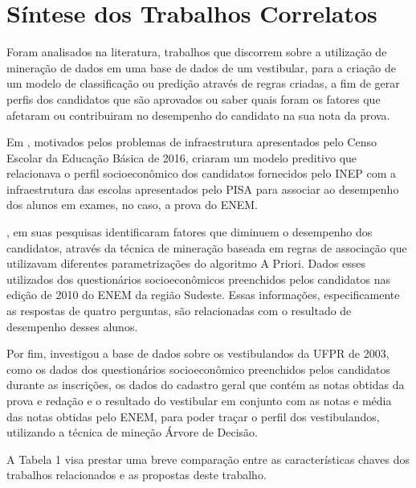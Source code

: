 \section{Síntese dos Trabalhos Correlatos}

\par
Foram analisados na literatura, trabalhos que discorrem sobre a utilização de mineração de dados em uma base de dados de um vestibular, para a criação de um modelo de classificação ou predição através de regras criadas, a fim de gerar perfis dos candidatos que são aprovados ou saber quais foram os fatores que afetaram ou contribuiram no desempenho do candidato na sua nota da prova.

\par
Em , motivados pelos problemas de infraestrutura apresentados pelo Censo Escolar da Educação Básica de 2016, criaram um modelo preditivo que relacionava o perfil socioeconômico dos candidatos fornecidos pelo INEP com a infraestrutura das escolas apresentados pelo PISA para associar ao desempenho dos alunos em exames, no caso, a prova do ENEM.

\par
{}, em suas pesquisas identificaram fatores que diminuem o desempenho dos candidatos, através da técnica de mineração baseada em regras de associação que utilizavam diferentes parametrizações do algoritmo A Priori. Dados esses utilizados dos questionários socioeconômicos preenchidos pelos candidatos nas edição de 2010 do ENEM da região Sudeste. Essas informações, especificamente as respostas de quatro perguntas, são relacionadas com o resultado de desempenho desses alunos.

\par
Por fim,  investigou a base de dados sobre os vestibulandos da UFPR de 2003, como os dados dos questionários socioeconômico preenchidos pelos candidatos durante as inscrições, os dados do cadastro geral que contém as notas obtidas da prova e redação e o resultado do vestibular em conjunto com as notas e média das notas obtidas pelo ENEM, para poder traçar o perfil dos vestibulandos, utilizando a técnica de mineção Árvore de Decisão.

\par
A Tabela 1 visa prestar uma breve comparação entre as características chaves dos trabalhos relacionados e as propostas deste trabalho.

